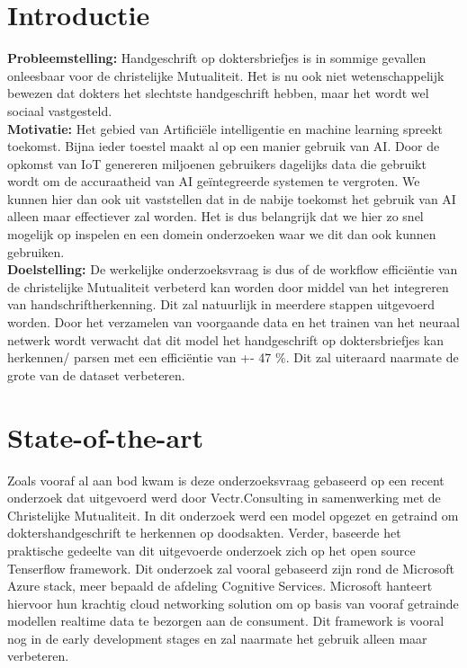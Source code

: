 
\section{Introductie} %
\label{sec:introductie}

\textbf{Probleemstelling:}
Handgeschrift op doktersbriefjes is in sommige gevallen onleesbaar voor de christelijke Mutualiteit. Het is nu ook niet wetenschappelijk bewezen dat dokters het slechtste handgeschrift hebben, maar het wordt wel sociaal vastgesteld. 
\\\textbf{Motivatie:}
Het gebied van Artificiële intelligentie en machine learning spreekt toekomst. Bijna ieder toestel maakt al op een manier gebruik van AI. Door de opkomst van IoT genereren miljoenen gebruikers dagelijks data die gebruikt wordt om de accuraatheid van AI geïntegreerde systemen te vergroten. \newline We kunnen hier dan ook uit vaststellen dat in de nabije toekomst het gebruik van AI alleen maar effectiever zal worden. Het is dus belangrijk dat we hier zo snel mogelijk op inspelen en een domein onderzoeken waar we dit dan ook kunnen gebruiken.  
\\\textbf{Doelstelling:}
De werkelijke onderzoeksvraag is dus of de workflow efficiëntie van de christelijke Mutualiteit verbeterd kan worden door middel van het integreren van handschriftherkenning. Dit zal natuurlijk in meerdere stappen uitgevoerd worden. Door het verzamelen van voorgaande data en het trainen van het neuraal netwerk wordt verwacht dat dit model het handgeschrift op doktersbriefjes kan herkennen/ parsen met een efficiëntie van +- 47 \%. Dit zal uiteraard naarmate de grote van de dataset verbeteren. 




\section{State-of-the-art}

\label{sec:state-of-the-art}

 
Zoals vooraf al aan bod kwam is deze onderzoeksvraag gebaseerd op een recent onderzoek dat uitgevoerd werd door Vectr.Consulting in samenwerking met de Christelijke Mutualiteit. In dit onderzoek werd een model opgezet en getraind om doktershandgeschrift te herkennen op doodsakten. Verder, baseerde het praktische gedeelte van dit uitgevoerde onderzoek zich op het open source Tenserflow framework. Dit onderzoek zal vooral gebaseerd zijn rond de Microsoft Azure stack, meer bepaald de afdeling Cognitive Services. Microsoft hanteert hiervoor hun krachtig cloud networking solution om op basis van vooraf getrainde modellen realtime data te bezorgen aan de consument. Dit framework is vooral nog in de early development stages en zal naarmate het gebruik alleen maar verbeteren. 

